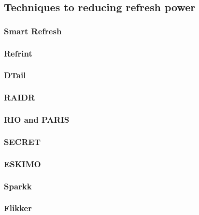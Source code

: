 \subsection{Techniques to reducing refresh power}


\subsubsection*{\textbf{Smart Refresh}}
\label{par:smartrefresh}


\subsubsection*{\textbf{Refrint}}
\label{par:refrint}


\subsubsection*{\textbf{DTail}}
\label{par:dtail}


\subsubsection*{\textbf{RAIDR}}
\label{par:raidr}


\subsubsection*{\textbf{RIO and PARIS}}
\label{par:rioparis}


\subsubsection*{\textbf{SECRET}}
\label{par:secret}


\subsubsection*{\textbf{ESKIMO}}
\label{par:eskimo}


\subsubsection*{\textbf{Sparkk}}
\label{par:sparkk}


\subsubsection*{\textbf{Flikker}}
\label{par:flikker}


